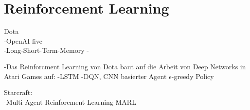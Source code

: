 \section{Reinforcement Learning}

Dota\\
-OpenAI five\\
-Long-Short-Term-Memory
-

-Das Reinforcment Learning von Dota baut auf die Arbeit von Deep Networks in Atari Games auf:
-LSTM
-DQN, CNN basierter Agent  $\epsilon$-greedy Policy


Starcraft:\\
-Multi-Agent Reinforcment Learning MARL






